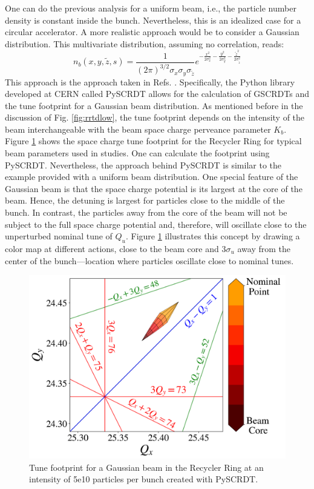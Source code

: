 One can do the previous analysis for a uniform beam, i.e., the particle number density is constant inside the bunch. Nevertheless, this is an idealized case for a circular accelerator. A more realistic approach would be to consider a Gaussian distribution. This multivariate distribution, assuming no correlation, reads:
\begin{equation}
    \label{eq:distgaussian}
    n_b(x,y,\tilde{z},s) = \frac{1}{\left(2 \pi \right)^{3/2} \sigma_x \sigma_y \sigma_{\tilde{z}}}e^{-\frac{x^2}{2 \sigma_x^2}-\frac{y^2}{2 \sigma_y^2}-\frac{\tilde{z}^2}{2 \sigma_{\tilde{z}}^2}}
\end{equation}
This approach is the approach taken in Refs. \cite{pyscrdt, scrdt_report}. Specifically, the Python library developed at CERN called PySCRDT \cite{pyscrdt} allows for the calculation of GSCRDTs and the tune footprint for a Gaussian beam distribution. As mentioned before in the discussion of Fig. \ref{fig:rrtdlow}, the tune footprint depends on the intensity of the beam interchangeable with the beam space charge perveance parameter $K_b$. Figure \ref{fig:rrtdmid} shows the space charge tune footprint for the Recycler Ring for typical beam parameters used in studies. One can calculate the footprint using PySCRDT. Nevertheless, the approach behind PySCRDT is similar to the example provided with a uniform beam distribution. One special feature of the Gaussian beam is that the space charge potential is its largest at the core of the beam. Hence, the detuning is largest for particles close to the middle of the bunch. In contrast, the particles away from the core of the beam will not be subject to the full space charge potential and, therefore, will oscillate close to the unperturbed nominal tune of $Q_u$. Figure \ref{fig:rrtdmid} illustrates this concept by drawing a color map at different actions, close to the beam core and $3\sigma_u$ away from the center of the bunch---location where particles oscillate close to nominal tunes.         

\begin{figure}[H]
    \centering
    \includegraphics[width=\columnwidth]{chapter2/rrtdmid.png}
    \caption{Tune footprint for a Gaussian beam in the Recycler Ring at an intensity of 5e10 particles per bunch created with PySCRDT.}
    \label{fig:rrtdmid}
 \end{figure}

